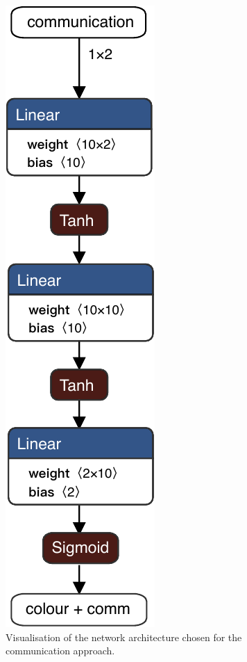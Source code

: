 \begin{figure}[!htb]
	\centering
	\includegraphics[width=.15\textwidth]{contents/images/task2allcomm}
	\caption[Network architectures for the communication approach.]{Visualisation 
	of the network architecture chosen for the 
		communication approach.}
	\label{fig:singlenetcomm2}
\end{figure}

